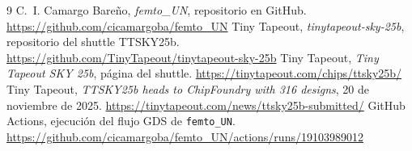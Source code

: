 \documentclass[11pt,letterpaper,oneside]{report}
\newcommand{\code}[1]{\texttt{#1}}
\begin{document}
\begin{thebibliography}{9}
 C.~I. Camargo Bareño, \emph{femto\_UN}, repositorio en GitHub. \url{https://github.com/cicamargoba/femto_UN}
 Tiny Tapeout, \emph{tinytapeout-sky-25b}, repositorio del shuttle TTSKY25b. \url{https://github.com/TinyTapeout/tinytapeout-sky-25b}
 Tiny Tapeout, \emph{Tiny Tapeout SKY 25b}, página del shuttle. \url{https://tinytapeout.com/chips/ttsky25b/}
 Tiny Tapeout, \emph{TTSKY25b heads to ChipFoundry with 316 designs}, 20 de noviembre de 2025. \url{https://tinytapeout.com/news/ttsky25b-submitted/}
 GitHub Actions, ejecución del flujo GDS de \code{femto\_UN}. \url{https://github.com/cicamargoba/femto_UN/actions/runs/19103989012}
\end{thebibliography}
\end{document}
